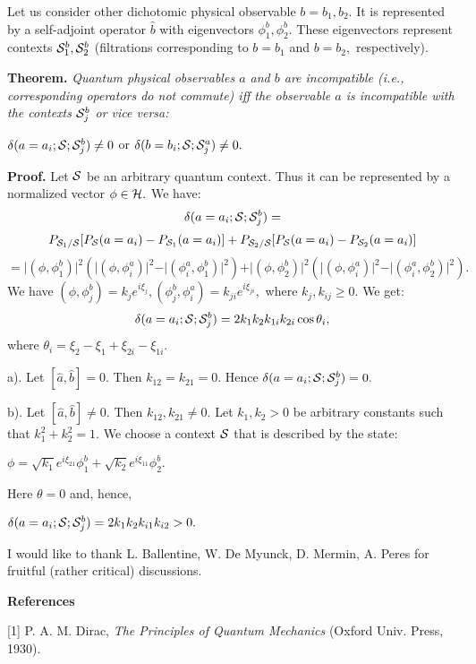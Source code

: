 \documentclass[12pt,oneside,final,a4paper]{article}
\begin{document}
Let us consider other dichotomic physical observable $b=b_1, b_2.$ It is represented
by a self-adjoint operator $\hat{b}$ with eigenvectors $\phi_1^b, \phi_2^b.$ 
These eigenvectors represent contexts ${\cal S}_1^b, {\cal S}_2^b$ 
(filtrations corresponding to $b=b_1$ and $b=b_2,$ respectively).

{\bf Theorem.} {\it Quantum physical observables $a$ and $b$ are incompatible
(i.e., corresponding operators do not commute) iff the observable $a$ is incompatible
with the contexts ${\cal S}_j^b$ or vice versa:}

$\delta(a=a_i; {\cal S}; {\cal S}_j^b)\not=0$ or $\delta(b=b_i; {\cal S}; {\cal S}_j^a)\not=0.$

{\bf Proof.} Let ${\cal S}$ be an arbitrary quantum context. Thus it can be represented
by a normalized vector $\phi \in {\cal H}.$ We have:
$$
\delta(a=a_i; {\cal S}; {\cal S}_j^b)=
$$
$$
P_{{\cal S}_1/{\cal S}} [P_{{\cal S}}(a=a_i)-
P_{{\cal S}_1}(a=a_i)]+ P_{{\cal S}_2/{\cal S}} [P_{{\cal S}}(a=a_i)-
P_{{\cal S}_2}(a=a_i)]
 $$
 $$
 = \vert (\phi, \phi_1^b)\vert^2( \vert (\phi, \phi_i^a)\vert^2 - \vert (\phi_i^a, \phi_1^b)\vert^2)
 + \vert (\phi, \phi_2^b)\vert^2( \vert (\phi, \phi_i^a)\vert^2 - \vert (\phi_i^a, \phi_2^b)\vert^2).
 $$
 We have $(\phi, \phi_j^b)= k_j e^{i \xi_j}, (\phi_j^b, \phi_i^a) = k_{ji} e^{i \xi_{ji}},$
 where $k_j, k_{ij} \geq 0.$ We get:
$$
\delta(a=a_i; {\cal S}; {\cal S}_j^b)= 2 k_1 k_2 k_{1i} k_{2i} \cos \theta_i,
$$
where $\theta_i= \xi_2-\xi_1 + \xi_{2i}- \xi_{1i}.$

a). Let $[\hat{a}, \hat{b}]=0.$ Then $k_{12}= k_{21}=0.$  Hence
$\delta(a=a_i; {\cal S}; {\cal S}_j^b)=0.$

b). Let $[\hat{a}, \hat{b}] \not =0.$ Then $k_{12}, k_{21}\not =0.$
Let $k_1,k_2 >0$ be arbitrary constants such that 
$k_1^2+k_2^2=1.$ We choose a context ${\cal S}$ that is described
by the state:

$\phi= \sqrt{k_1} e ^{i\xi_{21}} \phi_1^b +\sqrt{k_2} e ^{i\xi_{11}} \phi_2^b.$

Here $\theta=0$ and, hence,

$\delta(a=a_i; {\cal S}; {\cal S}_j^b)=2 k_1 k_2 k_{i1} k_{i2} >0.$



I would like to thank  L. Ballentine,  W. De Myunck, 
D. Mermin, A. Peres  for fruitful (rather critical) discussions. 

{\bf References}

[1] P. A. M.  Dirac, {\it The Principles of Quantum Mechanics}
(Oxford Univ. Press, 1930).
\end{document}
